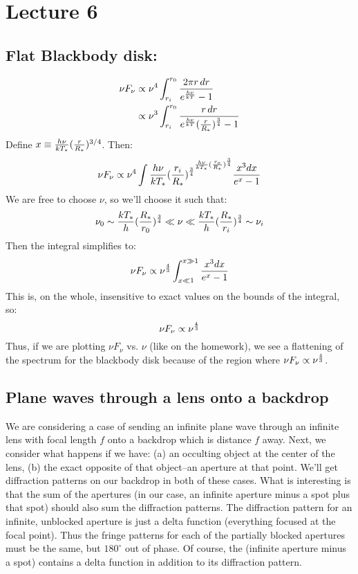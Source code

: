 \documentclass[11pt]{article}
\begin{document}
\section*{ Lecture 6 }

\def\eb{e^{h\nu \over kT}}

\subsection*{ Flat Blackbody disk:}

$$\begin{aligned}\nu F_\nu&\propto\nu^4\int_{r_i}^{r_0}{2\pi r\,dr\over\eb-1}\\ 
&\propto \nu^3\int_{r_i}^{r_0}{r\,dr\over 
e^{h\nu\over kT}({r\over R_*})^{3\over 4}-1}\\ \end{aligned}$$
Define $x \equiv {h\nu\over kT_*}({r\over R_*})^{3/4}$. Then:
\def\hnkt{{h\nu \over kT_*}}
\def\tq{{3\over 4}}
$$\nu F_\nu \propto \nu^4\int{{\hnkt ({r_i\over R_*})^\tq}^{\hnkt ({r_o\over 
R_*})^\tq}{x^3dx\over e^x - 1}}$$
We are free to choose $\nu$, so we'll choose it such that:
$$\nu_0\sim{kT_*\over h}({R_*\over r_0})^\tq\ll\nu\ll{kT_*\over h}
({R_*\over r_i})^\tq\sim\nu_i$$
Then the integral simplifies to:
$$\nu F_\nu \propto \nu^{4\over 3}\int_{x\ll 1}^{x\gg 1}{x^3dx\over e^x-1}$$
This is, on the whole, insensitive to exact values on the bounds of the
integral, so:
$$\nu F_\nu \propto \nu^{4\over 3}$$
Thus, if we are plotting $\nu F_\nu$ vs. $\nu$ (like on the homework), we
see a flattening of the spectrum for the blackbody disk because of the region
where $\nu F_\nu \propto \nu^{4\over 3}$.  

\subsection*{ Plane waves through a lens onto a backdrop}

We are considering a case of sending an infinite plane wave through an
infinite lens with focal length $f$ onto a backdrop which is distance $f$
away.  Next, we consider what happens if we have: (a) an occulting object
at the center of the lens, (b) the exact opposite of that object--an
aperture at that point.  We'll get diffraction patterns on our backdrop in
both of these cases.  What is interesting is that the sum of the apertures
(in our case, an infinite aperture minus a spot plus that spot) should also
sum the diffraction patterns.  The diffraction pattern for an infinite, 
unblocked aperture is just a delta function (everything focused at the 
focal point).  Thus the fringe patterns for each of the partially blocked
apertures must be the same, but $180^\circ$ out of phase.  Of course,
the (infinite aperture minus a spot) contains a delta function in addition
to its diffraction pattern.\par
\end{document}

